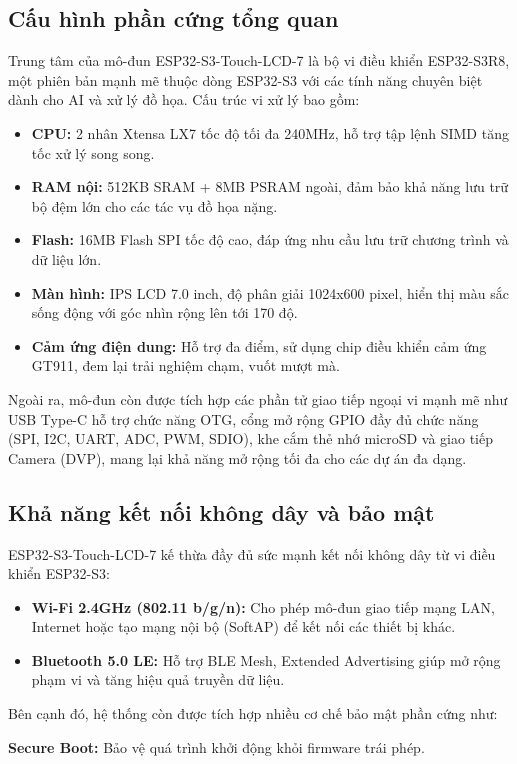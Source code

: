 \subsection{Cấu hình phần cứng tổng quan}
\tab Trung tâm của mô-đun ESP32-S3-Touch-LCD-7 là bộ vi điều khiển ESP32-S3R8, một phiên bản mạnh mẽ thuộc dòng ESP32-S3 với các tính năng chuyên biệt dành cho AI và xử lý đồ họa. Cấu trúc vi xử lý bao gồm:
\begin{itemize} 
  \item \textbf{CPU:} 2 nhân Xtensa LX7 tốc độ tối đa 240MHz, hỗ trợ tập lệnh SIMD tăng tốc xử lý song song. 
  \item \textbf{RAM nội:} 512KB SRAM + 8MB PSRAM ngoài, đảm bảo khả năng lưu trữ bộ đệm lớn cho các tác vụ đồ họa nặng. 
  \item \textbf{Flash:} 16MB Flash SPI tốc độ cao, đáp ứng nhu cầu lưu trữ chương trình và dữ liệu lớn. 
  \item \textbf{Màn hình:} IPS LCD 7.0 inch, độ phân giải 1024x600 pixel, hiển thị màu sắc sống động với góc nhìn rộng lên tới 170 độ. 
  \item \textbf{Cảm ứng điện dung:} Hỗ trợ đa điểm, sử dụng chip điều khiển cảm ứng GT911, đem lại trải nghiệm chạm, vuốt mượt mà. 
\end{itemize}
\tab Ngoài ra, mô-đun còn được tích hợp các phần tử giao tiếp ngoại vi mạnh mẽ như USB Type-C hỗ trợ chức năng OTG, cổng mở rộng GPIO đầy đủ chức năng (SPI, I2C, UART, ADC, PWM, SDIO), khe cắm thẻ nhớ microSD và giao tiếp Camera (DVP), mang lại khả năng mở rộng tối đa cho các dự án đa dạng.
\subsection{Khả năng kết nối không dây và bảo mật}
\tab ESP32-S3-Touch-LCD-7 kế thừa đầy đủ sức mạnh kết nối không dây từ vi điều khiển ESP32-S3:

\begin{itemize} 
  \item \textbf{Wi-Fi 2.4GHz (802.11 b/g/n):} Cho phép mô-đun giao tiếp mạng LAN, Internet hoặc tạo mạng nội bộ (SoftAP) để kết nối các thiết bị khác. 
  \item \textbf{Bluetooth 5.0 LE:} Hỗ trợ BLE Mesh, Extended Advertising giúp mở rộng phạm vi và tăng hiệu quả truyền dữ liệu. 
\end{itemize}

\tab Bên cạnh đó, hệ thống còn được tích hợp nhiều cơ chế bảo mật phần cứng như:

\textbf{Secure Boot:} Bảo vệ quá trình khởi động khỏi firmware trái phép.

